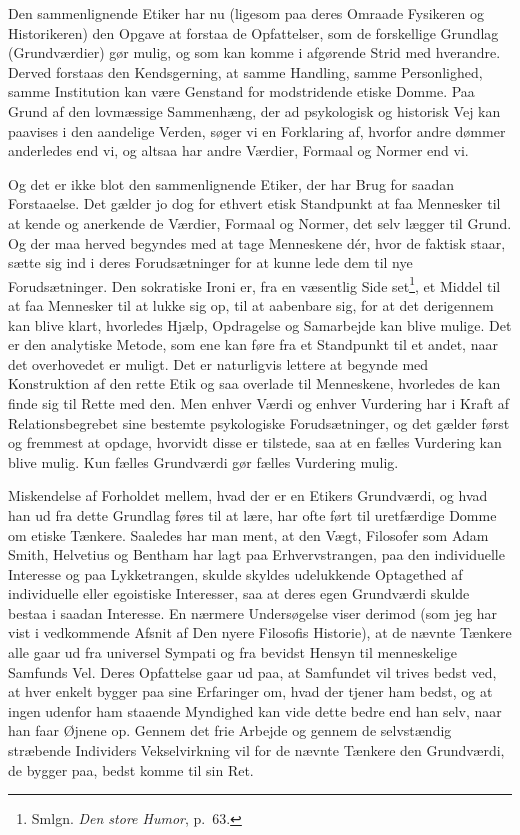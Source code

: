 \documentclass[12pt]{article}
\newcommand{\opage}[1]{\marginnote{\footnotesize\textit{[#1]}}}
\begin{document}
Den sammenlignende Etiker har nu (ligesom paa deres Omraade Fysikeren og
Historikeren) den Opgave at forstaa de Opfattelser, som de forskellige
Grundlag (Grundværdier) gør mulig, og som kan komme i afgørende Strid
\opage{85} \setcounter{footnote}{0}
med hverandre. Derved forstaas den Kendsgerning, at samme Handling,
samme Personlighed, samme Institution kan være Genstand for modstridende
etiske Domme. Paa Grund af den lovmæssige Sammenhæng, der ad psykologisk
og historisk Vej kan paavises i den aandelige Verden, søger vi en
Forklaring af, hvorfor andre dømmer anderledes end vi, og altsaa har
andre Værdier, Formaal og Normer end vi.

Og det er ikke blot den sammenlignende Etiker, der har Brug for saadan
Forstaaelse. Det gælder jo dog for ethvert etisk Standpunkt at faa
Mennesker til at kende og anerkende de Værdier, Formaal og Normer, det
selv lægger til Grund. Og der maa herved begyndes med at tage
Menneskene dér, hvor de faktisk staar, sætte sig ind i deres
Forudsætninger for at kunne lede dem til nye Forudsætninger. Den
sokratiske Ironi er, fra en væsentlig Side set\footnote{Smlgn.
\textit{Den store Humor}, p.~63.}, et Middel til at faa Mennesker til at
lukke sig op, til at aabenbare sig, for at det derigennem kan blive
klart, hvorledes Hjælp, Opdragelse og Samarbejde kan blive mulige. Det
er den analytiske Metode, som ene kan føre fra et Standpunkt til et
andet, naar det overhovedet er muligt. Det er naturligvis lettere at
begynde med Konstruktion af den \guillemotright
rette\guillemotleft{} Etik og saa overlade til Menneskene, hvorledes de
kan finde sig til Rette med den. Men enhver Værdi og enhver Vurdering
har i Kraft af Relationsbegrebet sine bestemte psykologiske
Forudsætninger, og det gælder først og fremmest at opdage, hvorvidt
disse er tilstede, saa at en fælles Vurdering kan blive mulig. Kun
fælles Grundværdi gør fælles Vurdering mulig.

Miskendelse af Forholdet mellem, hvad der er en Etikers Grundværdi, og
hvad han ud fra dette Grundlag føres til at lære, har ofte ført til
uretfærdige Domme om etiske
\opage{86} \setcounter{footnote}{0}
Tænkere. Saaledes har man ment, at den Vægt, Filosofer som Adam Smith,
Helvetius og Bentham har lagt paa Erhvervstrangen, paa den individuelle
Interesse og paa Lykketrangen, skulde skyldes udelukkende Optagethed af
individuelle eller egoistiske Interesser, saa at deres egen Grundværdi
skulde bestaa i saadan Interesse. En nærmere Undersøgelse viser derimod
(som jeg har vist i vedkommende Afsnit af \guillemotright Den nyere
Filosofis Historie\guillemotleft), at de nævnte Tænkere alle gaar ud
fra universel Sympati og fra bevidst Hensyn til menneskelige Samfunds
Vel. Deres Opfattelse gaar ud paa, at Samfundet vil trives bedst ved, at
hver enkelt bygger paa sine Erfaringer om, hvad der tjener ham bedst, og
at ingen udenfor ham staaende Myndighed kan vide dette bedre end han
selv, naar han faar Øjnene op. Gennem det frie Arbejde og gennem de
selvstændig stræbende Individers Vekselvirkning vil for de nævnte
Tænkere den Grundværdi, de bygger paa, bedst komme til sin Ret.
\end{document}
